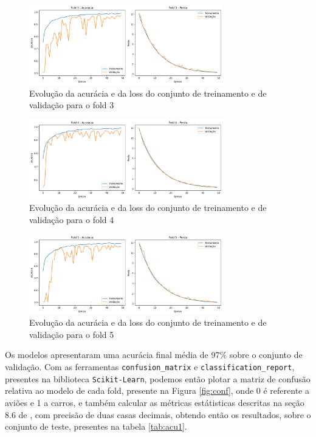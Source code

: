 \documentclass[]{abntex2}
\begin{document}
\begin{figure}[H]
    \centering 
    \includegraphics[width=0.75\textwidth]{imgs/ex2/train_f3.png}
    \caption{Evolução da acurácia e da loss do conjunto de treinamento e de validação para o fold 3}
    \label{fig:t3} %
\end{figure}

\begin{figure}[H]
    \centering 
    \includegraphics[width=0.75\textwidth]{imgs/ex2/train_f4.png}
    \caption{Evolução da acurácia e da loss do conjunto de treinamento e de validação para o fold 4}
    \label{fig:t4} %
\end{figure}

\begin{figure}[H]
    \centering 
    \includegraphics[width=0.75\textwidth]{imgs/ex2/train_f5.png}
    \caption{Evolução da acurácia e da loss do conjunto de treinamento e de validação para o fold 5}
    \label{fig:t5} %
\end{figure}

Os modelos apresentaram uma acurácia final média de 97\% sobre o conjunto de validação. Com as ferramentas \texttt{confusion\_matrix} e \texttt{classification\_report}, presentes na biblioteca \texttt{Scikit-Learn}, podemos então plotar a matriz de confusão relativa ao modelo de cada fold, presente na Figura \ref{fig:conf}, onde 0 é referente a aviões e 1 a carros, e também calcular as métricas estátisticas descritas na seção 8.6 de \cite{book}, com precisão de duas casas decimais, obtendo então os resultados, sobre o conjunto de teste, presentes na tabela \ref{tab:acu1}.
\end{document}
